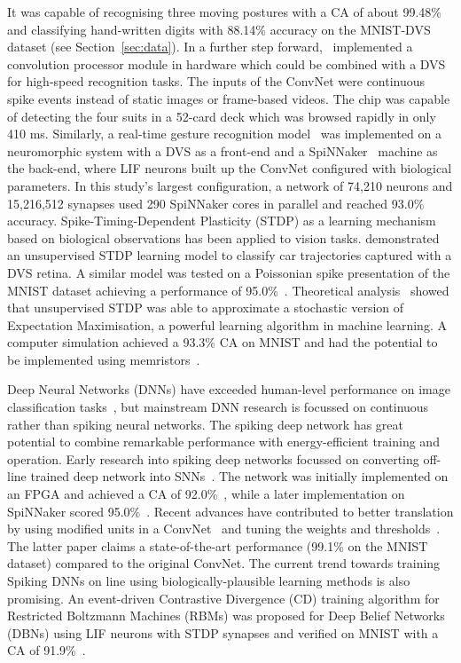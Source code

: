 It was capable of recognising three moving postures with a CA of about 99.48\% and classifying hand-written digits with 88.14\% accuracy on the MNIST-DVS dataset (see Section~\ref{sec:data}).
In a further step forward,~\cite{camunas2012event} implemented a convolution processor module in hardware which could be combined with a DVS for high-speed recognition tasks.
The inputs of the ConvNet were continuous spike events instead of static images or frame-based videos. 
The chip was capable of detecting the four suits in a 52-card deck which was browsed rapidly in only 410 ms.
Similarly, a real-time gesture recognition model~\cite{liu2014real} was implemented on a neuromorphic system with a DVS as a front-end and a SpiNNaker~\cite{furber2014spinnaker} machine as the back-end, where LIF neurons built up the ConvNet configured with biological parameters.
In this study's largest configuration, a network of 74,210 neurons and 15,216,512 synapses used 290 SpiNNaker cores in parallel and reached 93.0\% accuracy. 
Spike-Timing-Dependent Plasticity (STDP) as  a learning mechanism based on biological observations has been applied to vision tasks.
\cite{bichler2012extraction} demonstrated an unsupervised STDP learning model to classify car trajectories captured with a DVS retina. 
A similar model was tested on a Poissonian spike presentation of the MNIST dataset achieving a performance of 95.0\%~\cite{diehl2015unsupervised}.
Theoretical analysis~\cite{nessler2013bayesian} showed that unsupervised STDP was able to approximate a stochastic version of Expectation Maximisation, a powerful learning algorithm in machine learning.
A computer simulation achieved a 93.3\% CA on MNIST and had the potential to be implemented using memristors~\cite{bill2014compound}. 

Deep Neural Networks (DNNs) have exceeded human-level performance on image classification tasks~\cite{he2015delving}, but mainstream DNN research is focussed on continuous rather than spiking neural networks.
The spiking deep network has great potential to combine remarkable performance with energy-efficient training and operation.
Early research into spiking deep networks focussed on converting off-line trained deep network into SNNs~\cite{o2013real}.
The network was initially implemented on an FPGA and achieved a CA of 92.0\%~\cite{neil2014minitaur}, while a later implementation on SpiNNaker scored 95.0\%~\cite{Stromatias2015scalable}.
Recent advances have contributed to better translation by using modified units in a ConvNet~\cite{cao2015spiking} and tuning the weights and thresholds~\cite{diehl2015fast}.
The latter paper claims a state-of-the-art performance (99.1\% on the MNIST dataset) compared to the original ConvNet.
The current trend towards training Spiking DNNs on line using biologically-plausible learning methods is also promising.
An event-driven Contrastive Divergence (CD) training algorithm for Restricted Boltzmann Machines (RBMs) was proposed for Deep Belief Networks (DBNs) using LIF neurons with STDP synapses and verified on MNIST with a CA of 91.9\%~\cite{neftci2013event}.


